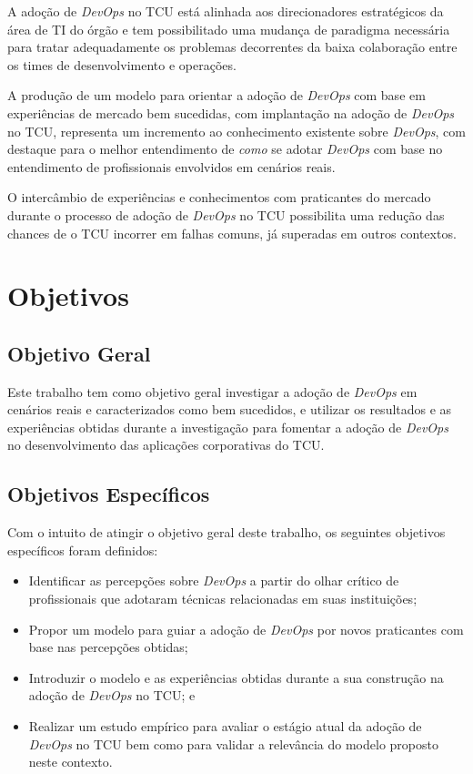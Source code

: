 A adoção de \textit{DevOps} no \acrshort{TCU} está alinhada aos direcionadores
estratégicos da área de \acrshort{TI} do órgão e tem possibilitado uma
mudança de paradigma necessária para tratar adequadamente os problemas
decorrentes da baixa colaboração entre os times de desenvolvimento e operações.

A produção de um modelo para orientar a adoção de \textit{DevOps} com base em
experiências de mercado bem sucedidas, com implantação na adoção de
\textit{DevOps} no \acrshort{TCU}, representa um
incremento ao conhecimento existente sobre \textit{DevOps}, com destaque
para o melhor entendimento de \emph{como} se adotar \textit{DevOps} com base no
entendimento de profissionais envolvidos em cenários reais.

O intercâmbio de experiências e conhecimentos com praticantes do mercado
durante o processo de adoção de \textit{DevOps} no TCU possibilita uma redução
das chances de o \acrshort{TCU} incorrer em falhas comuns, já superadas em
outros contextos.

\section{Objetivos}

\subsection{Objetivo Geral}

Este trabalho tem como objetivo geral investigar a adoção de {\it DevOps} em
cenários reais e caracterizados como bem sucedidos, e utilizar os resultados e as
experiências obtidas durante a investigação para fomentar a adoção de \textit{DevOps}
no desenvolvimento das aplicações corporativas do \acrshort{TCU}.

\subsection{Objetivos Específicos}
Com o intuito de atingir o objetivo geral deste trabalho, os seguintes objetivos
específicos foram definidos:

\begin{itemize}
\item Identificar as percepções sobre \textit{DevOps} a partir do olhar crítico
de profissionais que adotaram técnicas relacionadas em suas instituições;
\item Propor um modelo para guiar a adoção de \textit{DevOps} por novos
praticantes com base nas percepções obtidas;
\item Introduzir o modelo e as experiências obtidas durante a sua construção na
adoção de \textit{DevOps} no \acrshort{TCU}; e
\item Realizar um estudo empírico para avaliar o estágio atual da adoção de
\textit{DevOps} no \acrshort{TCU} bem como para validar a relevância do modelo
proposto neste contexto.
\end{itemize}

